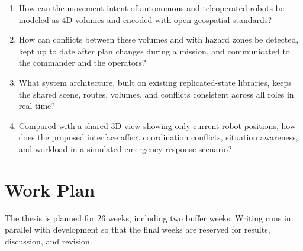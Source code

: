 \documentclass{article}
\begin{document}
\begin{enumerate}[label=\textbf{RQ\arabic*}]
  \item How can the movement intent of autonomous and teleoperated robots be modeled as 4D volumes and encoded with open geospatial standards?
  \item How can conflicts between these volumes and with hazard zones be detected, kept up to date after plan changes during a mission, and communicated to the commander and the operators?
  \item What system architecture, built on existing replicated-state libraries, keeps the shared scene, routes, volumes, and conflicts consistent across all roles in real time?
  \item Compared with a shared 3D view showing only current robot positions, how does the proposed interface affect coordination conflicts, situation awareness, and workload in a simulated emergency response scenario?
\end{enumerate}


\section{Work Plan}

The thesis is planned for 26 weeks, including two buffer weeks. Writing runs in parallel with development so that the final weeks are reserved for results, discussion, and revision.
\end{document}
